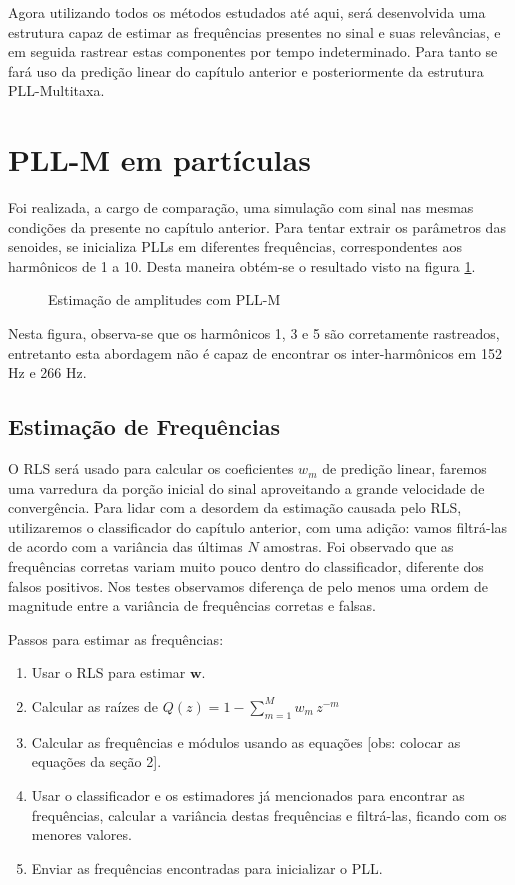 

Agora utilizando todos os métodos estudados até aqui, será desenvolvida uma estrutura capaz de estimar as frequências presentes no sinal e suas relevâncias, e em seguida rastrear estas componentes por tempo indeterminado. Para tanto se fará uso da predição linear do capítulo anterior e posteriormente da estrutura PLL-Multitaxa. 

\section{PLL-M em partículas}

Foi realizada, a cargo de comparação, uma simulação com sinal nas mesmas condições da presente no capítulo anterior. Para tentar extrair os parâmetros das senoides, se inicializa PLLs em diferentes frequências, correspondentes aos harmônicos de 1 a 10. Desta maneira obtém-se o resultado visto na figura \ref{fig:pll_comp}.

\begin{figure}[H]
	\centering    
	\def\svgwidth{\columnwidth}
	
	\caption{Estimação de amplitudes com PLL-M}
	\label{fig:pll_comp}
\end{figure}

Nesta figura, observa-se que os harmônicos 1, 3 e 5 são corretamente rastreados, entretanto esta abordagem não é capaz de encontrar os inter-harmônicos em 152 Hz e 266 Hz.

\subsection{Estimação de Frequências}

O RLS será usado para calcular os coeficientes $w_m$ de predição linear, faremos uma varredura da porção inicial do sinal aproveitando a grande velocidade de convergência. Para lidar com a desordem da estimação causada pelo RLS, utilizaremos o classificador do capítulo anterior, com uma adição: vamos filtrá-las de acordo com a variância das últimas $N$ amostras. Foi observado que as frequências corretas variam muito pouco dentro do classificador, diferente dos falsos positivos. Nos testes observamos diferença de pelo menos uma ordem de magnitude entre a variância de frequências corretas e falsas.

Passos para estimar as frequências:

\begin{enumerate}
	\item Usar o RLS para estimar $\boldsymbol{w}$.
	\item Calcular as raízes de $Q(z)=1-\sum_{m=1}^{M}w_m \, z^{-m}$
	\item Calcular as frequências e módulos usando as equações [obs: colocar as equações da seção 2].
	\item Usar o classificador e os estimadores já mencionados para encontrar as frequências, calcular a variância destas frequências e filtrá-las, ficando com os menores valores.
	\item Enviar as frequências encontradas para inicializar o PLL.  
\end{enumerate}
	
